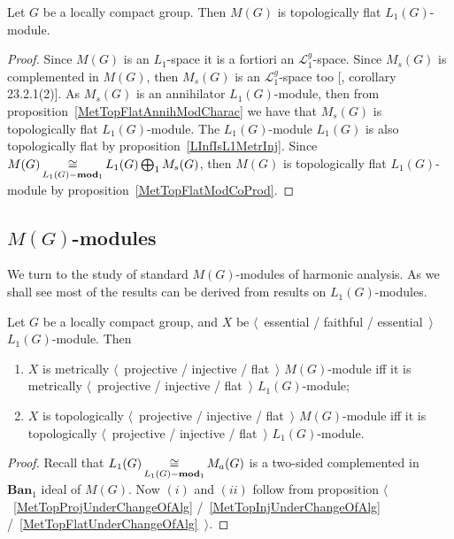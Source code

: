 \begin{proposition}\label{MeasAlgIsL1TopFlat} Let $G$ be a locally compact
group. Then $M(G)$ is topologically flat $L_1(G)$-module.
\end{proposition}
\begin{proof} Since $M(G)$ is an $L_1$-space it is a fortiori an
$\mathscr{L}_1^g$-space. Since $M_s(G)$ is complemented in $M(G)$, then $M_s(G)$
is an $\mathscr{L}_1^g$-space too [\cite{DefFloTensNorOpId}, corollary
23.2.1(2)]. As $M_s(G)$ is an annihilator $L_1(G)$-module, then from
proposition~\ref{MetTopFlatAnnihModCharac} we have that $M_s(G)$ is
topologically flat $L_1(G)$-module. The $L_1(G)$-module $L_1(G)$ is also
topologically flat by proposition~\ref{LInfIsL1MetrInj}. Since
$M(G)\mathop{\mathbin{\cong}}\limits_{L_1(G)-\mathbf{mod}_1}L_1(G)\bigoplus_1 M_s(G)$, then $M(G)$ is
topologically flat $L_1(G)$-module by proposition~\ref{MetTopFlatModCoProd}.
\end{proof}


\subsection{
    \texorpdfstring{$M(G)$}{M(G)}-modules}\label{
SubSectionMGModules}

We turn to the study of standard $M(G)$-modules of harmonic analysis. As we
shall see most of the results can be derived from results on $L_1(G)$-modules.

\begin{proposition}\label{MGMetTopProjInjFlatRedToL1} Let $G$ be a locally
compact group, and $X$ be $\langle$~essential / faithful / essential~$\rangle$
$L_1(G)$-module. Then

\begin{enumerate}[label = (\roman*)]
    \item $X$ is metrically $\langle$~projective / injective / flat~$\rangle$
    $M(G)$-module iff it is metrically $\langle$~projective / injective /
    flat~$\rangle$ $L_1(G)$-module;

    \item $X$ is topologically $\langle$~projective / injective / flat~$\rangle$
    $M(G)$-module iff it is topologically $\langle$~projective / injective /
    flat~$\rangle$ $L_1(G)$-module.
\end{enumerate}
\end{proposition}
\begin{proof} Recall that $L_1(G)\mathop{\mathbin{\cong}}\limits_{L_1(G)-\mathbf{mod}_1}M_a(G)$ is a
two-sided complemented in $\mathbf{Ban}_1$ ideal of $M(G)$. Now $(i)$ and $(ii)$
follow from proposition $\langle$~\ref{MetTopProjUnderChangeOfAlg}
/~\ref{MetTopInjUnderChangeOfAlg}  /~\ref{MetTopFlatUnderChangeOfAlg}~$\rangle$.
\end{proof} 


